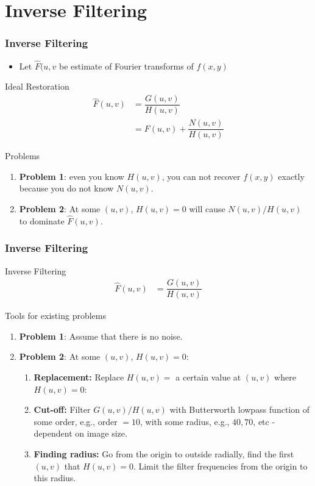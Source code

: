 \documentclass[english,11pt,table,handout]{beamer}
\begin{document}
\section{Inverse Filtering}
\frame
{
	\frametitle{Inverse Filtering }
	\begin{itemize}
		\item Let $\hat{F}(u,v$ be estimate of Fourier transforms of $f(x,y)$
	\end{itemize}
	
	\begin{block}{Ideal Restoration}
		\begin{align}
		\nonumber
		\hat{F}(u,v)  &= \dfrac{G(u,v)}{H(u,v)} \\
		\nonumber
				&= F(u,v) + \dfrac{N(u,v)}{H(u,v)}
		\end{align}
	\end{block}
	\begin{alertblock}{Problems}
		\begin{enumerate}
			\item \alert{\textbf{Problem 1}}: even you know $H(u,v)$, you can not recover $f(x,y)$ exactly because you do not know $N(u,v)$.
			\item \alert{\textbf{Problem 2}}: At some $(u,v)$, $H(u,v) = 0$ will cause $N(u,v)/H(u,v)$ to dominate $\hat{F}(u,v)$.
		\end{enumerate}
	\end{alertblock}
}
\frame
{
	\frametitle{Inverse Filtering }
	
	\begin{block}{Inverse Filtering}
		\begin{align}
		\nonumber
		\hat{F}(u,v)  &= \dfrac{G(u,v)}{H(u,v)}
		\end{align}
	\end{block}
	\begin{alertblock}{Tools for existing problems}
		\begin{enumerate}
			\item \alert{\textbf{Problem 1}}: Assume that there is no noise.
			\item \alert{\textbf{Problem 2}}: At some $(u,v)$, $H(u,v) = 0$:
				\begin{enumerate}
					\item \alert{\textbf{Replacement:}} Replace $H(u,v) =$ a certain value at $(u,v)$ where $H(u,v) = 0$:
					\item \alert{\textbf{Cut-off:}} Filter $G(u,v)/H(u,v)$ with Butterworth lowpass function of some order, e.g., order $=10$, with some radius, e.g., $40, 70$, etc - dependent on image size.
					\item \alert{\textbf{Finding radius:}} Go from the origin to outside radially, find the first $(u,v)$ that $H(u,v) = 0$. Limit the filter frequencies from the origin to this radius.
				\end{enumerate}
		\end{enumerate}
	\end{alertblock}
}
\end{document}
